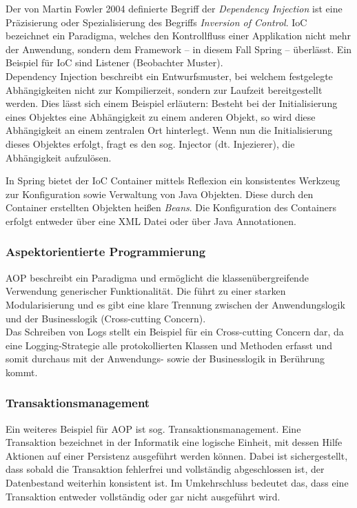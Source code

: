 				Der von Martin Fowler 2004 definierte Begriff der \textit{Dependency Injection} ist eine Präzisierung oder Spezialisierung des Begriffs \textit{Inversion of Control}. \ac{IoC} bezeichnet ein Paradigma, welches den Kontrollfluss einer Applikation nicht mehr der Anwendung, sondern dem Framework -- in diesem Fall Spring -- überlässt. Ein Beispiel für \ac{IoC} sind Listener (Beobachter Muster). \\
				Dependency Injection beschreibt ein Entwurfsmuster, bei welchem festgelegte Abhängigkeiten nicht zur Kompilierzeit, sondern zur Laufzeit bereitgestellt werden. Dies lässt sich einem Beispiel erläutern: Besteht bei der Initialisierung eines Objektes eine Abhängigkeit zu einem anderen Objekt, so wird diese Abhängigkeit an einem zentralen Ort hinterlegt. Wenn nun die Initialisierung dieses Objektes erfolgt, fragt es den sog. Injector (dt. Injezierer), die Abhängigkeit aufzulösen. \cite{MartinFowler.23.01.2020}
				
				In Spring bietet der \ac{IoC} Container mittels Reflexion ein konsistentes Werkzeug zur Konfiguration sowie Verwaltung von Java Objekten. Diese durch den Container erstellten Objekten heißen \textit{Beans}. Die Konfiguration des Containers erfolgt entweder über eine \ac{XML} Datei oder über Java Annotationen. \cite{Walls.20162017} 
				
			\subsubsection{Aspektorientierte Programmierung}
			
				\ac{AOP} beschreibt ein Paradigma und ermöglicht die klassenübergreifende Verwendung generischer Funktionalität. Die führt zu einer starken Modularisierung und es gibt eine klare Trennung zwischen der Anwendungslogik und der Businesslogik (Cross-cutting Concern). \cite{Wunderlich.2005} \\
				Das Schreiben von Logs stellt ein Beispiel für ein Cross-cutting Concern dar, da eine Logging-Strategie alle protokollierten Klassen und Methoden erfasst und somit durchaus mit der Anwendungs- sowie der Businesslogik in Berührung kommt. 
			
			\subsubsection{Transaktionsmanagement} %
			\label{frameworks.spring.transaktionsmanagement}
			
				Ein weiteres Beispiel für \ac{AOP} ist sog. Transaktionsmanagement. Eine Transaktion bezeichnet in der Informatik eine logische Einheit, mit dessen Hilfe Aktionen auf einer Persistenz ausgeführt werden können. Dabei ist sichergestellt, dass sobald die Transaktion fehlerfrei und vollständig abgeschlossen ist, der Datenbestand weiterhin konsistent ist. Im Umkehrschluss bedeutet das, dass eine Transaktion entweder vollständig oder gar nicht ausgeführt wird. \cite{Ozsu.2011}
			
